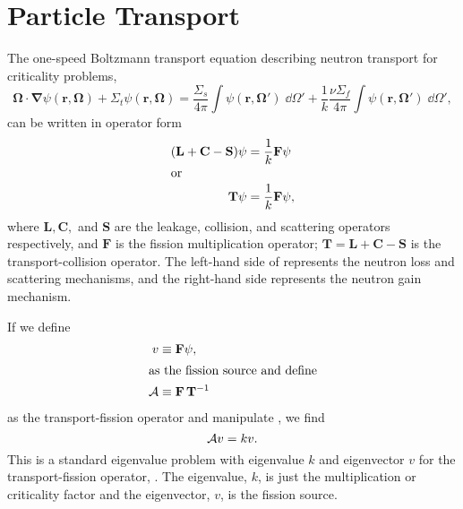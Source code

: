 \section{Particle Transport \label{sec:ParticleTransport}}
The one-speed Boltzmann transport equation describing neutron transport for criticality problems,
\begin{equation}
    \mathbf{\Omega}\cdot\mathbf{\nabla}\psi(\mathbf{r},\mathbf{\Omega})+\Sigma_t\psi(\mathbf{r},\mathbf{\Omega}) = \frac{\Sigma_s}{4\pi}\int \psi(\mathbf{r},\mathbf{\Omega'})\;\dd\Omega' + \frac{1}{k}\frac{\nu\Sigma_f}{4\pi}\int \psi(\mathbf{r},\mathbf{\Omega'})\;\dd\Omega',
    \label{eq:BoltzmannEquation}
\end{equation}
can be written in operator form
\begin{subequations}
    \begin{align}
    (\mathbf{L} + \mathbf{C} - \mathbf{S})\psi &= \frac{1}{k}\mathbf{F}\psi \\
    \intertext{or}
    \mathbf{T}\psi &= \frac{1}{k}\mathbf{F}\psi, \label{eq:BoltzmannOperatorForm}
\end{align}\end{subequations}
where $\mathbf{L}, \mathbf{C},$ and $\mathbf{S}$ are the leakage, collision, and scattering operators respectively, and $\mathbf{F}$ is the fission multiplication operator; $\mathbf{T} = \mathbf{L} + \mathbf{C} - \mathbf{S}$ is the transport-collision operator.  The left-hand side of  represents the neutron loss and scattering mechanisms, and the right-hand side represents the neutron gain mechanism.  

If we define
\begin{subequations}\begin{align}
    v &\equiv \mathbf{F}\psi, \\
    \intertext{as the fission source and define}
    \mathcal{A} &\equiv \mathbf{F}\,\mathbf{T}^{-1}  \label{eq:FissionTransportOperator}
\end{align}\end{subequations}
as the transport-fission operator and manipulate , we find
\begin{equation}
    \mathcal{A} v = kv. \label{eq:evalue}
\end{equation}
This is a standard eigenvalue problem with eigenvalue $k$ and eigenvector $v$ for the transport-fission operator, \A.  The eigenvalue, $k$, is just the multiplication or criticality factor and the eigenvector, $v$, is the fission source.

